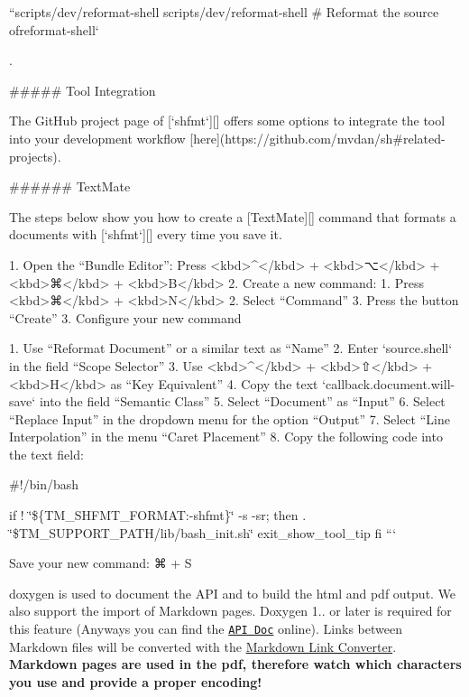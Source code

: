 ``{\ttfamily  scripts/dev/reformat-\/shell scripts/dev/reformat-\/shell \# Reformat the source of}reformat-\/shell` 
\begin{DoxyCode}
.

##### Tool Integration

The GitHub project page of [`shfmt`][] offers some options to integrate the tool into your development
       workflow [here](https://github.com/mvdan/sh#related-projects).

###### TextMate

The steps below show you how to create a [TextMate][] command that formats a documents with [`shfmt`][]
       every time you save it.

1. Open the “Bundle Editor”: Press <kbd>^</kbd> + <kbd>⌥</kbd> + <kbd>⌘</kbd> + <kbd>B</kbd>
2. Create a new command:
   1. Press <kbd>⌘</kbd> + <kbd>N</kbd>
   2. Select “Command”
   3. Press the button “Create”
3. Configure your new command

   1. Use “Reformat Document” or a similar text as “Name”
   2. Enter `source.shell` in the field “Scope Selector”
   3. Use <kbd>^</kbd> + <kbd>⇧</kbd> + <kbd>H</kbd> as “Key Equivalent”
   4. Copy the text `callback.document.will-save` into the field “Semantic Class”
   5. Select “Document” as “Input”
   6. Select “Replace Input” in the dropdown menu for the option “Output”
   7. Select “Line Interpolation” in the menu “Caret Placement”
   8. Copy the following code into the text field:
\end{DoxyCode}
 \#!/bin/bash

if ! \char`\"{}\$\{\+T\+M\+\_\+\+S\+H\+F\+M\+T\+\_\+\+F\+O\+R\+M\+A\+T\+:-\/shfmt\}\char`\"{} -\/s -\/sr; then . \char`\"{}\$\+T\+M\+\_\+\+S\+U\+P\+P\+O\+R\+T\+\_\+\+P\+A\+T\+H/lib/bash\+\_\+init.\+sh\char`\"{} exit\+\_\+show\+\_\+tool\+\_\+tip fi ```


\begin{DoxyEnumerate}
\item Save your new command\+: {\ttfamily ⌘} + {\ttfamily S}
\end{DoxyEnumerate}

{\ttfamily doxygen} is used to document the A\+PI and to build the html and pdf output. We also support the import of Markdown pages. Doxygen 1.. or later is required for this feature (Anyways you can find the \href{https://doc.libelektra.org/api/master/html/}{\tt A\+PI Doc} online). Links between Markdown files will be converted with the \hyperlink{doc_markdownlinkconverter_README_md}{Markdown Link Converter}. {\bfseries Markdown pages are used in the pdf, therefore watch which characters you use and provide a proper encoding!}


